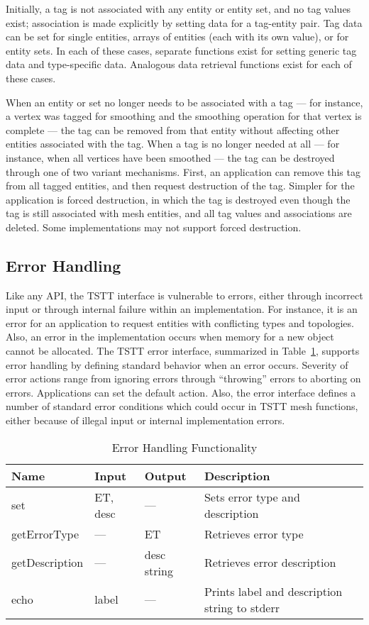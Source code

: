 Initially, a tag is not associated with any entity or entity set,
and no tag values exist; association is made explicitly by setting
data for a tag-entity pair. Tag data can be set for single entities,
arrays of entities (each with its own value), or for entity sets.
In each of these cases, separate functions exist for setting generic
tag data and type-specific data. Analogous data retrieval functions
exist for each of these cases. 

When an entity or set no longer needs to be associated with a tag
--- for instance, a vertex was tagged for smoothing and the smoothing
operation for that vertex is complete --- the tag can be removed from that entity
without affecting other entities associated with the tag. When a tag
is no longer needed at all --- for instance, when all vertices have
been smoothed --- the tag can be destroyed through one of two variant
mechanisms. First, an application can remove this tag from all
tagged entities, and then request destruction of the tag. Simpler
for the application is forced destruction, in which the tag is destroyed
even though the tag is still associated with mesh entities, and all
tag values and associations are deleted. Some implementations may
not support forced destruction.

\subsection{Error Handling\label{sub:Error-Handling}}

Like any API, the TSTT interface is vulnerable to errors, either through
incorrect input or through internal failure within an implementation.
For instance, it is an error for an application to request entities with
conflicting types and topologies. Also, an error in the implementation
occurs when memory for a new object cannot be allocated. The TSTT error
interface, summarized in Table~\ref{table:Error}, supports error
handling by defining standard behavior when an error occurs. Severity of
error actions range from ignoring errors through ``throwing'' errors to
aborting on errors.  Applications can set the default action.  Also, the
error interface defines a number of standard error conditions which
could occur in TSTT mesh functions, either because of illegal input or
internal implementation errors.

\begin{table}[tbp]
\caption{Error Handling Functionality}\label{table:Error}
{\small
\begin{tabular}{|p{1.25in}|p{0.75in}|p{0.75in}|p{223pt}|}
\hline 
Name&
Input&
Output&
Description\tabularnewline
\hline
\hline 
set&
ET, desc&
---&
Sets error type and description\tabularnewline
\hline 
getErrorType&
---&
ET&
Retrieves error type\tabularnewline
\hline 
getDescription&
---&
desc string&
Retrieves error description\tabularnewline
\hline 
echo&
label&
---&
Prints label and description string to stderr\tabularnewline
\hline
\end{tabular}
}
\end{table}
